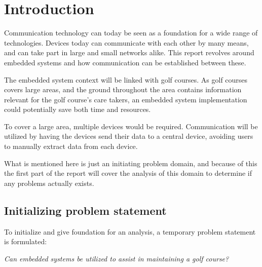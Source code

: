 \chapter{Introduction}
Communication technology can today be seen as a foundation for a wide range of technologies. Devices today can communicate with each other by many means, and can take part in large and small networks alike. This report revolves around embedded systems and how communication can be established between these.

The embedded system context will be linked with golf courses. As golf courses covers large areas, and the ground throughout the area contains information relevant for the golf course's care takers, an embedded system implementation could potentially save both time and resources. 

To cover a large area, multiple devices would be required. Communication will be utilized by having the devices send their data to a central device, avoiding users to manually extract data from each device.

What is mentioned here is just an initiating problem domain, and because of this the first part of the report will cover the analysis of this domain to determine if any problems actually exists.


\section*{Initializing problem statement}
To initialize and give foundation for an analysis, a temporary problem statement is formulated:

\textit{Can embedded systems be utilized to assist in maintaining a golf course?}


